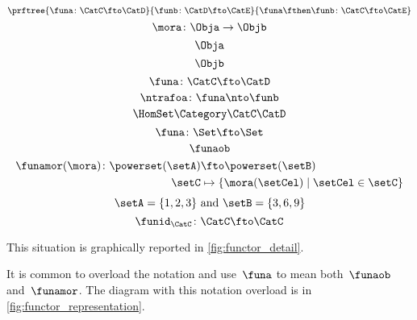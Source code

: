 {\begin{forslides}
\begin{equation}
\prftree{\funa\colon \CatC \fto \CatD}{\funb\colon\CatD\fto\CatE}{\funa\fthen\funb\colon \CatC \fto \CatE}
\end{equation}
\begin{equation}\label{eq:slides_mora}
\mora\colon \Obja\to\Objb
\end{equation}
\begin{equation}\label{eq:slides_mora_obja}
 \Obja
\end{equation}
\begin{equation}\label{eq:slides_mora_objb}
 \Objb
\end{equation}
\begin{equation}\label{eq:slides_funa}
 \funa\colon\CatC\fto\CatD
\end{equation}
\begin{equation}\label{eq:slides_ntrafoa}
 \ntrafoa\colon\funa\nto\funb
\end{equation}
\begin{equation}\label{eq:slides_hom}
 \HomSet\Category\CatC\CatD
\end{equation}
  \begin{equation}\label{eq:pow_fun_1}
    \funa\colon \Set \fto \Set
\end{equation}
    \begin{equation}
\label{eq:pow_fun_2}
    \funaob
\end{equation}
      \begin{equation}
\label{eq:pow_fun_3}
\begin{aligned}
    \funamor(\mora)\colon \powerset(\setA)&\fto \powerset(\setB)\\
    \setC&\mapsto \{ \mora(\setCel) \mid \setCel \in \setC\}
\end{aligned}
\end{equation}
\begin{equation}
  \label{eq:pow_fun_4}
    \setA=\{ 1,2,3\} \text{ and }\setB=\{3,6,9\}
\end{equation}
  \begin{equation}
  \label{eq:idfun}
    \funid_\CatC \colon \CatC \fto \CatC
\end{equation}
\end{forslides}}

This situation is graphically reported in \cref{fig:functor_detail}.

It is common to overload the notation and use~$\funa$ to mean both~$\funaob$ and~$\funamor$. The diagram with this notation overload is in \cref{fig:functor_representation}.


